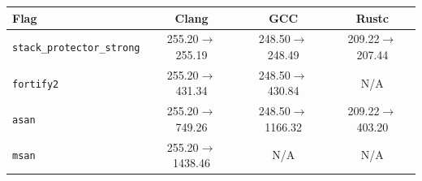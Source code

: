 \begin{tabular*}{\columnwidth}{@{\extracolsep\fill}lccc@{\extracolsep\fill}}
\toprule
\textbf{Flag} & \textbf{Clang} & \textbf{GCC} & \textbf{Rustc} \\
\midrule
\texttt{stack\_protector\_strong} & 255.20$\to$255.19 & 248.50$\to$248.49 & 209.22$\to$207.44 \\
\texttt{fortify2} & 255.20$\to$431.34 & 248.50$\to$430.84 & N/A \\
\texttt{asan} & 255.20$\to$749.26 & 248.50$\to$1166.32 & 209.22$\to$403.20 \\
\texttt{msan} & 255.20$\to$1438.46 & N/A & N/A \\
\bottomrule
\end{tabular*}
